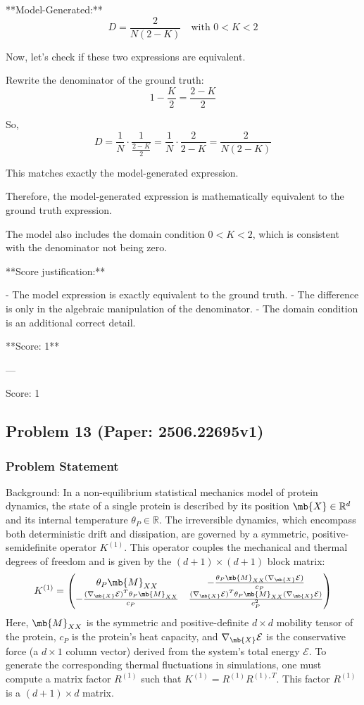 \documentclass[10pt]{article}
\begin{document}
**Model-Generated:**
\[
D = \frac{2}{N (2 - K)} \quad \text{with } 0 < K < 2
\]

Now, let's check if these two expressions are equivalent.

Rewrite the denominator of the ground truth:
\[
1 - \frac{K}{2} = \frac{2 - K}{2}
\]

So,
\[
D = \frac{1}{N} \cdot \frac{1}{\frac{2 - K}{2}} = \frac{1}{N} \cdot \frac{2}{2 - K} = \frac{2}{N (2 - K)}
\]

This matches exactly the model-generated expression.

Therefore, the model-generated expression is mathematically equivalent to the ground truth expression.

The model also includes the domain condition \(0 < K < 2\), which is consistent with the denominator not being zero.

**Score justification:**

- The model expression is exactly equivalent to the ground truth.
- The difference is only in the algebraic manipulation of the denominator.
- The domain condition is an additional correct detail.

**Score: 1**

---

Score: 1

\newpage
\subsection*{Problem 13 (Paper: 2506.22695v1)}
\subsubsection*{Problem Statement}
Background:
In a non-equilibrium statistical mechanics model of protein dynamics, the state of a single protein is described by its position $\mb{X} \in \mathbb{R}^d$ and its internal temperature $\theta_P \in \mathbb{R}$. The irreversible dynamics, which encompass both deterministic drift and dissipation, are governed by a symmetric, positive-semidefinite operator $K^{(1)}$. This operator couples the mechanical and thermal degrees of freedom and is given by the $(d+1) \times (d+1)$ block matrix:
\begin{equation*}
K^{(1)} = 
\begin{pmatrix}
\theta_P \mb{M}_{\tiny XX} & -\frac{\theta_P \mb{M}_{\tiny XX}(\nabla_{\mb{X}} \mathcal{E})}{c_P} \\
-\frac{(\nabla_{\mb{X}} \mathcal{E})^{T}\theta_P \mb{M}_{\tiny XX}}{c_P} & \frac{(\nabla_{\mb{X}} \mathcal{E})^{T}\theta_P \mb{M}_{\tiny XX}(\nabla_{\mb{X}} \mathcal{E})}{c_P^2}
\end{pmatrix}
\end{equation*}
Here, $\mb{M}_{\tiny XX}$ is the symmetric and positive-definite $d \times d$ mobility tensor of the protein, $c_P$ is the protein's heat capacity, and $\nabla_{\mb{X}} \mathcal{E}$ is the conservative force (a $d \times 1$ column vector) derived from the system's total energy $\mathcal{E}$. To generate the corresponding thermal fluctuations in simulations, one must compute a matrix factor $R^{(1)}$ such that $K^{(1)} = R^{(1)}R^{(1),T}$. This factor $R^{(1)}$ is a $(d+1) \times d$ matrix.
\end{document}
